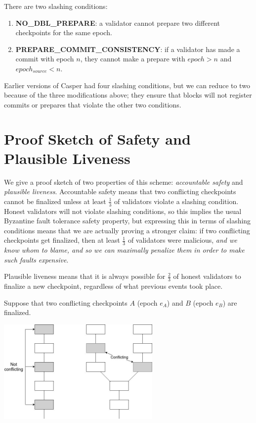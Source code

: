 \documentclass[12pt]{article}
\begin{document}
There are two slashing conditions:

\begin{enumerate}
\item \textbf{NO\_DBL\_PREPARE}: a validator cannot prepare two different checkpoints for the same epoch.
\item \textbf{PREPARE\_COMMIT\_CONSISTENCY}: if a validator has made a commit with epoch $n$, they cannot make a prepare with $epoch > n$ and $epoch_{source} < n$.
\end{enumerate}

Earlier versions of Casper had four slashing conditions, but we can reduce to two because of the three modifications above; they ensure that blocks will not register commits or prepares that violate the other two conditions.

\section{Proof Sketch of Safety and Plausible Liveness}

We give a proof sketch of two properties of this scheme: \textit{accountable safety} and \textit{plausible liveness}. Accountable safety means that two conflicting checkpoints cannot be finalized unless at least $\frac{1}{3}$ of validators violate a slashing condition. Honest validators will not violate slashing conditions, so this implies the usual Byzantine fault tolerance safety property, but expressing this in terms of slashing conditions means that we are actually proving a stronger claim: if two conflicting checkpoints get finalized, then at least $\frac{1}{3}$ of validators were malicious, \textit{and we know whom to blame, and so we can maximally penalize them in order to make such faults expensive}.

Plausible liveness means that it is always possible for $\frac{2}{3}$ of honest validators to finalize a new checkpoint, regardless of what previous events took place.

Suppose that two conflicting checkpoints $A$ (epoch $e_A$) and $B$ (epoch $e_B$) are finalized.

\includegraphics[width=300px]{conflicting_checkpoints.png}
\end{document}
